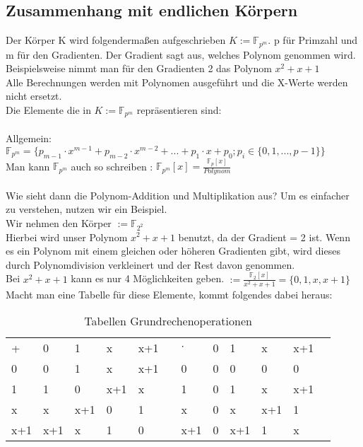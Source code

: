 \subsection{Zusammenhang mit endlichen Körpern}

Der Körper K wird folgendermaßen aufgeschrieben $ K := \mathbb{F}_{p^m}$. p für Primzahl und m für den Gradienten. Der Gradient sagt aus, welches Polynom genommen wird. 
Beispielsweise nimmt man für den Gradienten 2 das Polynom $x^2 + x + 1$\\
Alle Berechnungen werden mit Polynomen ausgeführt und die X-Werte werden nicht ersetzt.
\\
Die Elemente die in $ K := \mathbb{F}_{p^m}$ repräsentieren sind:\\
\\
Allgemein: $  \mathbb{F}_{p^m} = \{p_{m-1} \cdot x^{m-1} + p_{m-2} \cdot x^{m-2} + ... + p_1 \cdot x + p_0 ; p_i \in \{0,1,..., p-1\} \}$\\
Man kann $\mathbb{F}_{p^m}$ auch so schreiben : $\mathbb{F}_{p^m}[x] = \frac{\mathbb{F}_{p}[x]}{Polynom} $\\
\\
Wie sieht dann die Polynom-Addition und Multiplikation aus? Um es einfacher zu verstehen, nutzen wir ein Beispiel.
\\
Wir nehmen den Körper $ := \mathbb{F}_{2^2}$
\\
Hierbei wird unser Polynom $ x^2+ x + 1 $ benutzt, da der Gradient = 2 ist. Wenn es ein Polynom mit einem gleichen oder höheren Gradienten gibt, wird dieses durch Polynomdivision verkleinert und der Rest davon genommen.\\
Bei $ x^2+ x + 1 $ kann es nur 4 Möglichkeiten geben. $ := \frac{\mathbb{F}_{2}[x]}{x^2+ x + 1} = \{0, 1, x, x+1\}$\\

Macht man eine Tabelle für diese Elemente, kommt folgendes dabei heraus:

\begin{table}[h]\caption{Tabellen Grundrechenoperationen}
    \begin{tabular}{l|l|l|l|lll|l|l|l|ll}
    +   & 0   & 1   & x   & x+1 &  & $\cdot$   & 0 & 1   & x   & x+1 &  \\ \cline{1-5} \cline{7-11}
    0   & 0   & 1   & x   & x+1 &  & 0   & 0 & 0   & 0   & 0   &  \\ \cline{1-5} \cline{7-11}
    1   & 1   & 0   & x+1 & x   &  & 1   & 0 & 1   & x   & x+1 &  \\ \cline{1-5} \cline{7-11}
    x   & x   & x+1 & 0   & 1   &  & x   & 0 & x   & x+1 & 1   &  \\ \cline{1-5} \cline{7-11}
    x+1 & x+1 & x   & 1   & 0   &  & x+1 & 0 & x+1 & 1   & x   & 
    \end{tabular}
\end{table}
